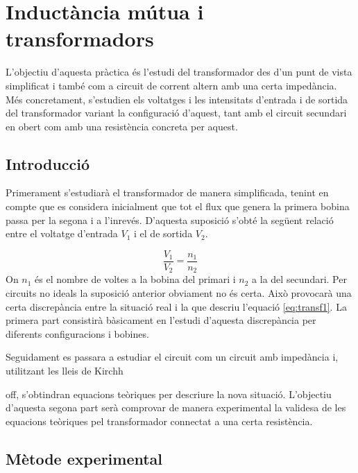 \chapter{Inductància mútua i transformadors}

\begin{resum}
L'objectiu d'aquesta pràctica és l'estudi del transformador des d'un punt de vista simplificat i també com a circuit de corrent altern amb una certa impedància. Més concretament, s'estudien els voltatges i les intensitats d'entrada i de sortida del transformador variant la configuració d'aquest, tant amb el circuit secundari en obert com amb una resistència concreta per aquest.
\end{resum}

\section{Introducció}\label{sec:introducció}

Primerament s'estudiarà el transformador de manera simplificada, tenint en compte que es considera inicialment que tot el flux que genera la primera bobina passa per la segona i a l'inrevés. D'aquesta suposició s'obté la següent relació entre el voltatge d'entrada $V_1$ i el de sortida $V_2$. 

\begin{equation}\label{eq:transf1}
    \frac{V_1}{V_2}=\frac{n_1}{n_2}
\end{equation}
On $n_1$ és el nombre de voltes a la bobina del primari i $n_2$ a la del secundari. Per circuits no ideals la suposició anterior obviament no és certa. Això provocarà una certa discrepància entre la situació real i la que descriu l'equació \cref{eq:transf1}. La primera part consistirà bàsicament en l'estudi d'aquesta discrepància per diferents configuracions i bobines.

Seguidament es passara a estudiar el circuit com un circuit amb impedància i, utilitzant les lleis de Kirchh



off, s'obtindran equacions teòriques per descriure la nova situació. L'objectiu d'aquesta segona part serà comprovar de manera experimental la validesa de les equacions teòriques pel transformador connectat a una certa resistència.

\section{Mètode experimental}\label{sec:met}

